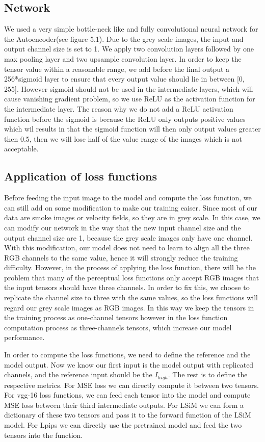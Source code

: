 \documentclass[a4paper,12pt,twoside]{report}
\begin{document}
\subsection{Network}
We used a very simple bottle-neck like and fully convolutional neural network for the Autoencoder(see figure 5.1). Due to the grey scale images, the input and output channel size is set to 1. We apply two convolution layers followed by one max pooling layer and two upsample convolution layer. In order to keep the tensor value within a reasonable range, we add before the final output a 256*sigmoid layer to ensure that every output value should lie in between [0, 255]. However sigmoid should not be used in the intermediate layers, which will cause vanishing gradient problem, so we use ReLU as the activation function for the intermediate layer. The reason why we do not add a ReLU activation function before the sigmoid is because the ReLU only outputs positive values which wil results in that the sigmoid function will then only output values greater then 0.5, then we will lose half of the value range of the images which is not acceptable.
\subsection{Application of loss functions}
Before feeding the input image to the model and compute the loss function, we can still add on some modification to make our training eaiser. Since most of our data are smoke images or velocity fields, so they are in grey scale. In this case, we can modify our network in the way that the new input channel size and the output channel size are 1, because the grey scale images only have one channel. With this modification, our model does not need to learn to align all the three RGB channels to the same value, hence it will strongly reduce the training difficulty. However, in the process of applying the loss function, there will be the problem that many of the perceptual loss functions only accept RGB images that the input tensors should have three channels. In order to fix this, we choose to replicate the channel size to three with the same values, so the loss functions will regard our grey scale images as RGB images. In this way we keep the tensors in the training process as one-channel tensors however in the loss function computation process as three-channels tensors, which increase our model performance.

In order to compute the loss functions, we need to define the reference and the model output. Now we know our first input is the model output with replicated channels, and the reference input should be the $I_{high}$. The rest is to define the respective metrics. For MSE loss we can directly compute it between two tensors. For vgg-16 loss functions, we can feed each tensor into the model and compute MSE loss between their third intermediate outputs. For LSiM we can form a dictionary of these two tensors and pass it to the forward function of the LSiM model. For Lpips we can directly use the pretrained model and feed the two tensors into the function.
\end{document}
